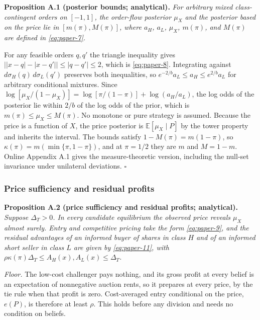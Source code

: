 \protect{}\label{result-proposition-a-1}{\textbf{Proposition
A.1 (posterior bounds; analytical).}} \emph{For arbitrary mixed
class-contingent orders on \([-1,1]\), the order-flow posterior
\(\mu_X\) and the posterior based on the price lie in
\([m(\pi),M(\pi)]\), where \(a_H\), \(a_L\), \(\mu_X\), \(m(\pi)\), and
\(M(\pi)\) are defined in \eqref{eq:paper-7}.}

For any feasible orders \(q,q'\) the triangle inequality gives
\(\big||x-q|-|x-q'|\big|\le|q-q'|\le2\), which is \eqref{eq:paper-8}.
Integrating against \(d\sigma_H(q)\,d\sigma_L(q')\) preserves both
inequalities, so \(e^{-2/b}a_L\le a_H\le e^{2/b}a_L\) for arbitrary
conditional mixtures. Since
\(\log[\mu_X/(1-\mu_X)]=\log[\pi/(1-\pi)]+\log(a_H/a_L)\), the log odds
of the posterior lie within \(2/b\) of the log odds of the prior, which
is \(m(\pi)\le\mu_X\le M(\pi)\). No monotone or pure strategy is
assumed. Because the price is a function of \(X\), the price posterior
is \(\mathbb E[\mu_X\mid P]\) by the tower property and inherits the
interval. The bounds satisfy \(1-M(\pi)=m(1-\pi)\), so
\(\kappa(\pi)=m(\min\{\pi,1-\pi\})\), and at \(\pi=1/2\) they are \(m\)
and \(M=1-m\). Online Appendix A.1 gives the measure-theoretic version,
including the null-set invariance under unilateral deviations.
\(\square\)


\subsubsection{Price sufficiency and residual
profits}\label{price-sufficiency-and-residual-profits}

\protect{}\label{result-proposition-a-2}{\textbf{Proposition
A.2 (price sufficiency and residual profits; analytical).}}
\emph{Suppose \(\Delta_T>0\). In every candidate equilibrium the
observed price reveals \(\mu_X\) almost surely. Entry and competitive
pricing take the form \eqref{eq:paper-9}, and the residual advantages
of an informed buyer of shares in class \(H\) and of an informed short
seller in class \(L\) are given by \eqref{eq:paper-11}, with
\(\rho\kappa(\pi)\Delta_T\le A_H(x),A_L(x)\le\Delta_T\).}

\emph{Floor.} The low-cost challenger pays nothing, and its gross profit
at every belief is an expectation of nonnegative auction rents, so it
prepares at every price, by the tie rule when that profit is zero.
Cost-averaged entry conditional on the price, \(e(P)\), is therefore at
least \(\rho\). This holds before any division and needs no condition on
beliefs.

